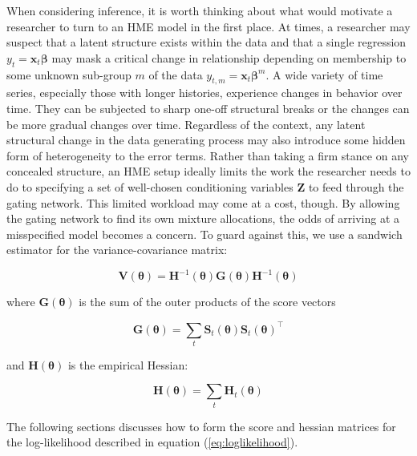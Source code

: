 \documentclass[12pt]{article}
\newcommand{\Ht}[1]{\mathbf{H}_{t}(#1)}
\newcommand{\HH}[1]{\boldsymbol{H}(#1)}
\newcommand{\HI}[1]{\boldsymbol{H}^{-1}(#1)}
\theoremstyle{definition}
\begin{document}
When considering inference, it is worth thinking about what would motivate a researcher to turn to an HME model in the first place. At times, a researcher may suspect that a latent structure exists within the data and that a single regression $y_{t} = \boldsymbol{x}_{t} \boldsymbol{\beta}$ may mask a critical change in relationship depending on membership to some unknown sub-group $m$ of the data $y_{t,m} = \boldsymbol{x}_{t} \boldsymbol{\beta}^{m}$. A wide variety of time series, especially those with longer histories, experience changes in behavior over time. They can be subjected to sharp one-off structural breaks or the changes can be more gradual changes over time. Regardless of the context, any latent structural change in the data generating process may also introduce some hidden form of heterogeneity to the error terms. Rather than taking a firm stance on any concealed structure, an HME setup ideally limits the work the researcher needs to do to specifying a set of well-chosen conditioning variables $\boldsymbol{Z}$ to feed through the gating network. This limited workload may come at a cost, though. By allowing the gating network to find its own mixture allocations, the odds of arriving at a misspecified model becomes a concern. To guard against this, we use a sandwich estimator for the variance-covariance matrix:

\begin{equation} \label{eq:robustgatevarcov}
  \boldsymbol{V}(\boldsymbol{\theta}) = \HI{\boldsymbol{\theta}} \boldsymbol{G}(\boldsymbol{\theta}) \HI{\boldsymbol{\theta}}
\end{equation}

where $\boldsymbol{G}(\boldsymbol{\theta})$ is the sum of the outer products of the score vectors

\begin{equation} \label{eq:OPG}
  \boldsymbol{G}(\boldsymbol{\theta}) = \sum_{t} \boldsymbol{S}_{t}(\boldsymbol{\theta}) \boldsymbol{S}_{t}(\boldsymbol{\theta})^\top
\end{equation}

and $\HH{\boldsymbol{\theta}}$ is the empirical Hessian:

\begin{equation} \label{eq:Hessian}
  \HH{\boldsymbol{\theta}} = \sum_{t} \Ht{\boldsymbol{\theta}}
\end{equation}

The following sections discusses how to form the score and hessian matrices for the log-likelihood described in equation (\ref{eq:loglikelihood}).
\end{document}
